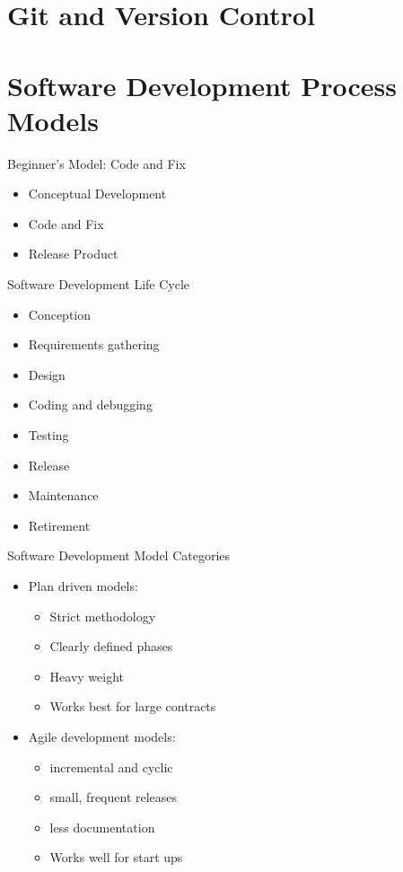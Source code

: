 \documentclass[12pt]{article}
\begin{document}
\section{Git and Version Control}
\section{Software Development Process Models}

Beginner's Model: Code and Fix
\begin{itemize}
    \item Conceptual Development
    \item Code and Fix
    \item Release Product
\end{itemize}

Software Development Life Cycle
\begin{itemize}
    \item Conception
    \item Requirements gathering
    \item Design
    \item Coding and debugging
    \item Testing
    \item Release
    \item Maintenance
    \item Retirement
\end{itemize}

Software Development Model Categories
\begin{itemize}
    \item Plan driven models:
    \begin{itemize}
        \item Strict methodology
        \item Clearly defined phases
        \item Heavy weight
        \item Works best for large contracts
    \end{itemize}
    \item Agile development models:
    \begin{itemize}
        \item incremental and cyclic
        \item small, frequent releases
        \item less documentation
        \item Works well for start ups
    \end{itemize}
\end{itemize}
\end{document}
